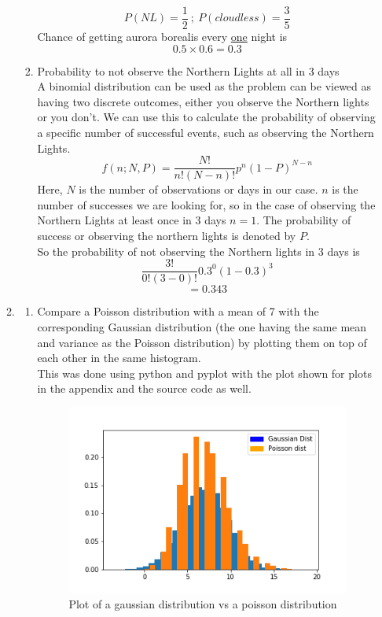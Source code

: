 \documentclass[12pt]{article}
\begin{document}
\begin{enumerate}
\begin{enumerate}
\begin{enumerate}
        $$ P(NL) = \frac{1}{2} \ ; \ P(cloudless) = \frac{3}{5} $$
        Chance of getting aurora borealis every \underline{one} night is 
        $$ 0.5 \times 0.6 = 0.3 $$
        \item Probability to not observe the Northern Lights at all in 3 days 
        \\
        A binomial distribution can be used as the problem can be viewed as having two discrete outcomes, either you observe the Northern lights or you don't. We can use this to calculate the probability of observing a specific number of successful events, such as observing the Northern Lights. 
        $$f(n;N,P) = \frac{N!}{n!(N-n)!} p^n (1- P)^{N-n}$$
        Here, $N$ is the number of observations or days in our case. $n$ is the number of successes we are looking for, so in the case of observing the Northern Lights at least once in 3 days $n=1$. The probability of success or observing the northern lights is denoted by $P$.\\
        So the probability of not observing the Northern lights in 3 days is 
        $$ \frac{3!}{0!(3-0)!} 0.3^0 (1-0.3)^3 $$
        $$ = 0.343 $$
    \end{enumerate}
    \item \begin{enumerate}
        \item Compare a Poisson distribution with a mean of 7 with the corresponding Gaussian distribution (the one having the same mean and variance as the Poisson distribution) by plotting them on top of each other in the same histogram.
        \\
        This was done using python and pyplot with the plot shown for plots in the appendix and the source code as well.
        \begin{figure}[h] 
            \includegraphics[width=10cm]{GVsP.png}
            \centering
            \caption{Plot of a gaussian distribution vs a poisson distribution}
        \end{figure}



\end{enumerate}
\end{enumerate}
\end{enumerate}
\end{document}
